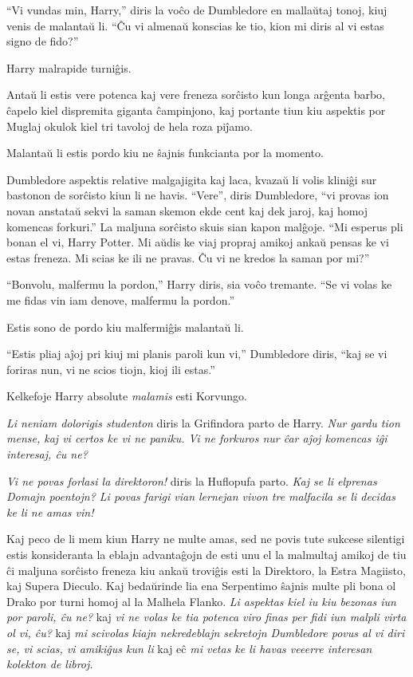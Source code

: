``Vi vundas min, Harry,'' diris la voĉo de Dumbledore en mallaŭtaj
tonoj, kiuj venis de malantaŭ li. ``Ĉu vi almenaŭ konscias ke tio,
kion mi diris al vi estas signo de fido?''

Harry malrapide turniĝis.

Antaŭ li estis vere potenca kaj vere freneza sorĉisto kun longa
arĝenta barbo, ĉapelo kiel dispremita giganta ĉampinjono, kaj portante
tiun kiu aspektis por Muglaj okulok kiel tri tavoloj de hela roza
piĵamo.

Malantaŭ li estis pordo kiu ne ŝajnis funkcianta por la momento.

Dumbledore aspektis relative malgajigita kaj laca, kvazaŭ li volis
kliniĝi sur bastonon de sorĉisto kiun li ne havis. ``Vere'', diris
Dumbledore, ``vi provas ion novan anstataŭ sekvi la saman skemon ekde
cent kaj dek jaroj, kaj homoj komencas forkuri.'' La maljuna sorĉisto
skuis sian kapon malĝoje. ``Mi esperus pli bonan el vi, Harry
Potter. Mi aŭdis ke viaj propraj amikoj ankaŭ pensas ke vi estas
freneza. Mi scias ke ili ne pravas. Ĉu vi ne kredos la saman por mi?''


``Bonvolu, malfermu la pordon,'' Harry diris, sia voĉo tremante. ``Se
vi volas ke me fidas vin iam denove, malfermu la pordon.''

Estis sono de pordo kiu malfermiĝis malantaŭ li.

``Estis pliaj aĵoj pri kiuj mi planis paroli kun vi,'' Dumbledore
diris, ``kaj se vi foriras nun, vi ne scios tiojn, kioj ili estas.''

Kelkefoje Harry absolute \emph{malamis} esti Korvungo.

\emph{Li neniam dolorigis studenton} diris la Grifindora parto de
Harry. \emph{Nur gardu tion mense, kaj vi certos ke vi ne paniku. Vi ne
  forkuros nur ĉar aĵoj komencas iĝi interesaj, ĉu ne?}

\emph{Vi ne povas forlasi la direktoron!} diris la Huflopufa
parto. \emph{Kaj se li elprenas Domajn poentojn? Li povas farigi vian
lernejan vivon tre malfacila se li decidas ke li ne amas vin!}

Kaj peco de li mem kiun Harry ne multe amas, sed ne povis tute sukcese
silentigi estis konsideranta la eblajn advantaĝojn de esti unu el la
malmultaj amikoj de tiu ĉi maljuna sorĉisto freneza kiu ankaŭ troviĝis
esti la Direktoro, la Estra Magiisto, kaj Supera Dieculo. Kaj
bedaŭrinde lia ena Serpentimo ŝajnis multe pli bona ol Drako por turni
homoj al la Malhela Flanko. \emph{Li aspektas kiel iu kiu bezonas iun
por paroli, ĉu ne?} kaj \emph{vi ne volas ke tia potenca viro finas
per fidi iun malpli virta ol vi, ĉu?} kaj \emph{mi scivolas kiajn
nekredeblajn sekretojn Dumbledore povus al vi diri se, vi scias, vi
amikiĝus kun li} kaj eĉ \emph{mi vetas ke li havas veeerre interesan
kolekton de libroj.} 

